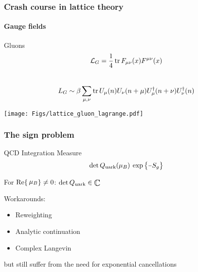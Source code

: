 \documentclass[12pt,a4paper,dvipsnames,usenames]{beamer}
\begin{document}
\begin{frame}
  \frametitle{Crash course in lattice theory}
  \framesubtitle{Gauge fields}

  \begin{block}{Gluons}
      \[
       \mathcal{L}_G = \frac{1}{4} \operatorname{tr} F_{\mu\nu}(x) F^{\mu\nu}(x)
      \]
      \\
      \[
        L_G \sim \beta\sum_{\mu,\nu} \operatorname{tr} U_{\mu}(n) U_{\nu}(n+\mu) U^{\dagger}_{\mu}(n+\nu) U^{\dagger}_{\nu}(n)
      \]
  \end{block}

  \begin{center}
    \texttt{[image: Figs/lattice\_gluon\_lagrange.pdf]}
  \end{center}

  
\end{frame}

\begin{frame}
  \frametitle{The sign problem}
  
  \begin{block}{QCD Integration Measure}
    \[
      \det \qmat (\mu_B) \: \exp \big\{ \minus S_g \big\} \tikzmark{measure}
    \]
  \end{block}

  \vspace{.3cm}

  For \hskip5pt$\real \{\hskip2pt\raisebox{1pt}{$\mu_B$}\} \neq 0$: \; $\det \qmat \in \raisebox{-1.5pt}{\scalebox{1.25}{$\mathbb{C}$}}$ 

  \vspace{.3cm}

  \begin{alertblock}{Workarounds:}
    \begin{itemize} \color{LightUIBase}
      \item Reweighting
      \item Analytic continuation
      \item Complex Langevin
    \end{itemize}\vspace*{-1em}
  \end{alertblock}

  \vspace{.2cm}
  but still suffer from the need for exponential cancellations
  
\end{frame}
\end{document}
